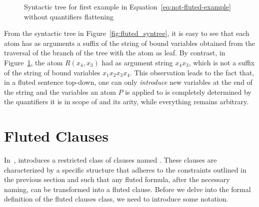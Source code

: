 \begin{figure}[H]
    \centering
    \caption{Syntactic tree for first example in Equation~\ref{eq:not-fluted-example} without quantifiers flattening}\label{fig:not_fluted_syntree}
\end{figure}

From the syntactic tree in Figure~\ref{fig:fluted_syntree}, it is easy to see that each atom has as arguments a suffix of the string of bound variables obtained from the traversal of the branch of the tree with the atom as leaf.
By contrast, in Figure~\ref{fig:not_fluted_syntree}, the atom \(R(x_4, x_3)\) had as argument string \(x_4 x_3\), which is not a suffix of the string of bound variables \(x_1 x_2 x_3 x_4\).
This observation leads to the fact that, in  a fluted sentence top-down, one can only \emph{introduce} new variables at the end of the string and the variables an atom \(P\) is applied to is completely determined by the quantifiers it is in scope of and its arity, while everything remains arbitrary.

\section{Fluted Clauses}\label{sec:fluted-clauses}

In~\cite{schmidt2000resolution}, \citeauthor{schmidt2000resolution} introduces a restricted class of clauses named .
These clauses are characterized by a specific structure that adheres to the constraints outlined in the previous section and such that any fluted formula, after the necessary naming, can be transformed into a fluted clause.
Before we delve into the formal definition of the fluted clauses class, we need to introduce some notation.

